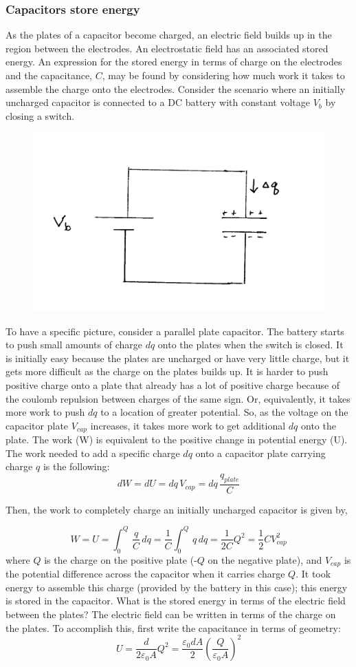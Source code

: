 \documentclass[12pt]{article}
\begin{document}
\begin{flushleft}
\subsubsection*{\bf Capacitors store energy}

As the plates of a capacitor become charged, an electric field builds up in the region between the electrodes.  An electrostatic field has an associated stored energy.  An expression for the stored energy in terms of charge on the electrodes and the capacitance, $C$, may be found by considering how much work it takes to assemble the charge onto the electrodes.  Consider the scenario where an initially uncharged capacitor is connected to a DC battery with constant voltage $V_{b}$ by closing a switch.  

\begin{figure}[h]
\centering
\includegraphics*[trim=0cm .5cm 0cm 0cm, clip=true, width=0.4\columnwidth]{chrgcap.png}
\end{figure}

To have a specific picture, consider a parallel plate capacitor.  The battery starts to push small amounts of charge $dq$ onto the plates when the switch is closed.  It is initially easy because the plates are uncharged or have very little charge, but it gets more difficult as the charge on the plates builds up.  It is harder to push positive charge onto a plate that already has a lot of positive charge because of the coulomb repulsion between charges of the same sign.  Or, equivalently, it takes more work to push $dq$ to a location of greater potential.  So, as the voltage on the capacitor plate $V_{cap}$ increases, it takes more work to get additional $dq$ onto the plate.  The work (W) is equivalent to the positive change in potential energy (U).  The work  needed to add a specific charge $dq$ onto a capacitor plate carrying charge $q$ is the following:
\[
dW = dU = dq \, V_{cap} = dq \, \frac{q_{plate}}{C}
\]

Then, the work to completely charge an initially uncharged capacitor is given by,

\[
W =U = \int_{0}^{Q} \, \frac{q}{C} \, dq = \frac{1}{C} \int_{0}^{Q} \, q \, dq = \frac{1}{2C}Q^{2} = \frac{1}{2}CV_{cap}^{2}
\]
where $Q$ is the charge on the positive plate (-$Q$ on the negative plate), and $V_{cap}$ is the potential difference across the capacitor when it carries charge $Q$.  It took energy to assemble this charge (provided by the battery in this case); this energy is stored in the capacitor.  What is the stored energy in terms of the electric field between the plates?  The electric field can be written in terms of the charge on the plates.  To accomplish this, first write the capacitance in terms of geometry:
\[
U = \frac{d}{2\varepsilon_{0}A}Q^{2} =  \frac{\varepsilon_{0}dA}{2}\left( \frac{Q}{\varepsilon_{0}A} \right)^{2} 
\]


\end{flushleft}
\end{document}
